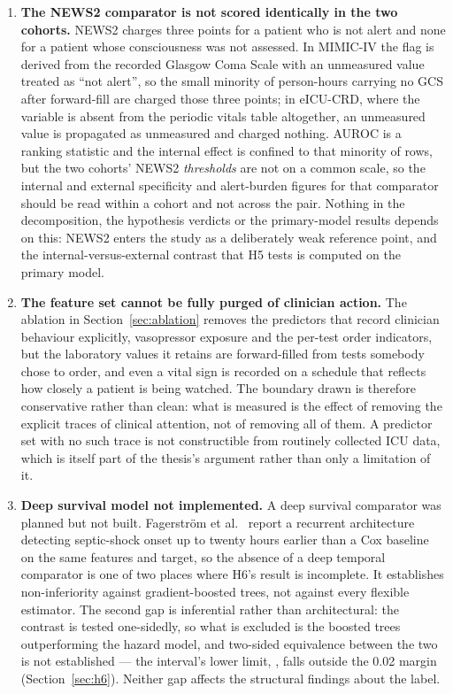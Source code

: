 \begin{enumerate}
    \item \textbf{The NEWS2 comparator is not scored identically in the two
    cohorts.} NEWS2 charges three points for a patient who is not alert and
    none for a patient whose consciousness was not assessed. In MIMIC-IV the
    flag is derived from the recorded Glasgow Coma Scale with an unmeasured
    value treated as ``not alert'', so the small minority of person-hours
    carrying no GCS after forward-fill are charged those three points; in
    eICU-CRD, where the variable is absent from the periodic vitals table
    altogether, an unmeasured value is propagated as unmeasured and charged
    nothing. AUROC is a ranking statistic and the internal effect is confined
    to that minority of rows, but the two cohorts' NEWS2 \emph{thresholds} are
    not on a common scale, so the internal and external specificity and
    alert-burden figures for that comparator should be read within a cohort and
    not across the pair. Nothing in the decomposition, the hypothesis verdicts
    or the primary-model results depends on this: NEWS2 enters the study as a
    deliberately weak reference point, and the internal-versus-external
    contrast that H5 tests is computed on the primary model.

    \item \textbf{The feature set cannot be fully purged of clinician action.}
    The ablation in Section~\ref{sec:ablation} removes the
    \pcAblNDropped{} predictors that record clinician behaviour explicitly, vasopressor exposure and the per-test order indicators, but the
    laboratory values it retains are forward-filled from tests somebody chose
    to order, and even a vital sign is recorded on a schedule that reflects how
    closely a patient is being watched. The boundary drawn is therefore
    conservative rather than clean: what is measured is the effect of removing
    the explicit traces of clinical attention, not of removing all of them. A
    predictor set with no such trace is not constructible from routinely
    collected ICU data, which is itself part of the thesis's argument rather
    than only a limitation of it.

    \item \textbf{Deep survival model not implemented.} A deep survival
    comparator was planned but not built. Fagerstr{\"o}m et al.\
    \cite{fagerstrom2019lisep} report a recurrent architecture detecting
    septic-shock onset up to twenty hours earlier than a Cox baseline on the
    same features and target, so the absence of a deep temporal comparator is
    one of two places where H6's result is incomplete. It establishes
    non-inferiority against gradient-boosted trees, not against every flexible
    estimator. The second gap is inferential rather than architectural: the
    contrast is tested one-sidedly, so what is excluded is the boosted trees
    outperforming the hazard model, and two-sided equivalence between the two is
    not established --- the interval's lower limit, \pcHSixCiLo, falls outside
    the 0.02 margin (Section~\ref{sec:h6}). Neither gap affects the structural
    findings about the label.


\end{enumerate}
